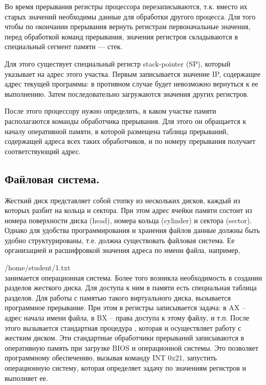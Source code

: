 \documentclass[a4paper, fleqn]{article}
\begin{document}
			Во время прерывания регистры процессора перезаписываются, т.к. вместо их старых значений необходимы данные для обработки другого процесса.   Для того чтобы по окончании прерывания вернуть регистрам первоначальные значения, перед обработкой команд прерывания, значения регистров складываются в специальный сегмент памяти --- стек.
			
			Для этого существует специальный регистр stack-pointer (SP), который указывает на адрес этого участка. 
			Первым записывается значение IP, содержащее адрес текущей программы: в противном случае будет невозможно вернуться к ее выполнению. Затем последовательно загружаются значения других регистров.
			
			После этого процессору нужно определить, в каком участке памяти располагаются команды обработчика прерывания. Для этого он обращается к началу оперативной памяти, в которой размещена таблица прерываний, содержащей адреса всех таких обработчиков, и по номеру прерывания получает соответствующий адрес.
			
		\subsection*{Файловая система.}  
			Жесткий диск представляет собой стопку из нескольких дисков, каждый из которых разбит на кольца и сектора. При этом адрес ячейки памяти состоит из номера поверхности диска (head), номера кольца (cylinder) и сектора (sector).  Однако для удобства программирования и хранения файлов данные должны быть удобно структурированы, т.е. должна существовать файловая система. Ее организацией и расшифровкой значения адреса по имени файла, например, \par
			/home/student/1.txt
			\\
			занимается операционная система. Более того возникла необходимость в создании разделов жесткого диска. 
			Для доступа к ним в памяти есть специальная таблица разделов. Для работы с памятью такого виртуального диска, вызывается программное прерывание. При этом в регистры записывается задача: в AX – адрес начала имени файла, в BX – права доступа  к этому файлу, и т.п. После этого вызывается стандартная процедура , которая и осуществляет работу с жестким диском. Эти стандартные обработчики прерываний записываются в оперативную память при загрузке BIOS и операционной системы. Это позволяет программному обеспечению, вызывая команду INT 0x21, запустить операционную систему, которая определяет задачу по значениям регистров и выполняет ее.
			
\end{document}
